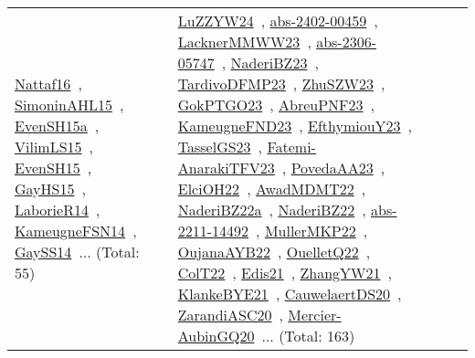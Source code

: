{\begin{longtable}{lp{3cm}>{\raggedright\arraybackslash}p{6cm}>{\raggedright\arraybackslash}p{6cm}>{\raggedright\arraybackslash}p{8cm}}
\href{../works/Nattaf16.pdf}{Nattaf16}~\cite{Nattaf16}, \href{../works/SimoninAHL15.pdf}{SimoninAHL15}~\cite{SimoninAHL15}, \href{../works/EvenSH15a.pdf}{EvenSH15a}~\cite{EvenSH15a}, \href{../works/VilimLS15.pdf}{VilimLS15}~\cite{VilimLS15}, \href{../works/EvenSH15.pdf}{EvenSH15}~\cite{EvenSH15}, \href{../works/GayHS15.pdf}{GayHS15}~\cite{GayHS15}, \href{../works/LaborieR14.pdf}{LaborieR14}~\cite{LaborieR14}, \href{../works/KameugneFSN14.pdf}{KameugneFSN14}~\cite{KameugneFSN14}, \href{../works/GaySS14.pdf}{GaySS14}~\cite{GaySS14}... (Total: 55) & \href{../works/LuZZYW24.pdf}{LuZZYW24}~\cite{LuZZYW24}, \href{../works/abs-2402-00459.pdf}{abs-2402-00459}~\cite{abs-2402-00459}, \href{../works/LacknerMMWW23.pdf}{LacknerMMWW23}~\cite{LacknerMMWW23}, \href{../works/abs-2306-05747.pdf}{abs-2306-05747}~\cite{abs-2306-05747}, \href{../works/NaderiBZ23.pdf}{NaderiBZ23}~\cite{NaderiBZ23}, \href{../works/TardivoDFMP23.pdf}{TardivoDFMP23}~\cite{TardivoDFMP23}, \href{../works/ZhuSZW23.pdf}{ZhuSZW23}~\cite{ZhuSZW23}, \href{../works/GokPTGO23.pdf}{GokPTGO23}~\cite{GokPTGO23}, \href{../works/AbreuPNF23.pdf}{AbreuPNF23}~\cite{AbreuPNF23}, \href{../works/KameugneFND23.pdf}{KameugneFND23}~\cite{KameugneFND23}, \href{../works/EfthymiouY23.pdf}{EfthymiouY23}~\cite{EfthymiouY23}, \href{../works/TasselGS23.pdf}{TasselGS23}~\cite{TasselGS23}, \href{../works/Fatemi-AnarakiTFV23.pdf}{Fatemi-AnarakiTFV23}~\cite{Fatemi-AnarakiTFV23}, \href{../works/PovedaAA23.pdf}{PovedaAA23}~\cite{PovedaAA23}, \href{../works/ElciOH22.pdf}{ElciOH22}~\cite{ElciOH22}, \href{../works/AwadMDMT22.pdf}{AwadMDMT22}~\cite{AwadMDMT22}, \href{../works/NaderiBZ22a.pdf}{NaderiBZ22a}~\cite{NaderiBZ22a}, \href{../works/NaderiBZ22.pdf}{NaderiBZ22}~\cite{NaderiBZ22}, \href{../works/abs-2211-14492.pdf}{abs-2211-14492}~\cite{abs-2211-14492}, \href{../works/MullerMKP22.pdf}{MullerMKP22}~\cite{MullerMKP22}, \href{../works/OujanaAYB22.pdf}{OujanaAYB22}~\cite{OujanaAYB22}, \href{../works/OuelletQ22.pdf}{OuelletQ22}~\cite{OuelletQ22}, \href{../works/ColT22.pdf}{ColT22}~\cite{ColT22}, \href{../works/Edis21.pdf}{Edis21}~\cite{Edis21}, \href{../works/ZhangYW21.pdf}{ZhangYW21}~\cite{ZhangYW21}, \href{../works/KlankeBYE21.pdf}{KlankeBYE21}~\cite{KlankeBYE21}, \href{../works/CauwelaertDS20.pdf}{CauwelaertDS20}~\cite{CauwelaertDS20}, \href{../works/ZarandiASC20.pdf}{ZarandiASC20}~\cite{ZarandiASC20}, \href{../works/Mercier-AubinGQ20.pdf}{Mercier-AubinGQ20}~\cite{Mercier-AubinGQ20}... (Total: 163)\\

\end{longtable}}
